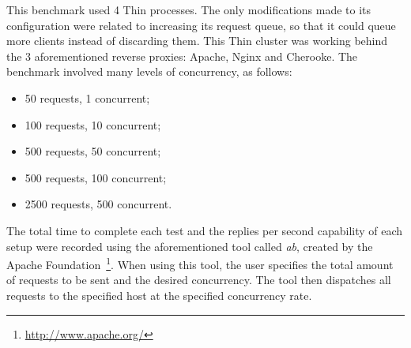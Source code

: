 This benchmark used 4 Thin processes. The only modifications made to its configuration were related to increasing its request queue, so that it could queue more clients instead of discarding them. This Thin cluster was working behind the 3 aforementioned reverse proxies: Apache, Nginx and Cherooke. The benchmark involved many levels of concurrency, as follows:
\begin{itemize}
  \item 50 requests, 1 concurrent;
  \item 100 requests, 10 concurrent;
  \item 500 requests, 50 concurrent;
  \item 500 requests, 100 concurrent;
  \item 2500 requests, 500 concurrent.
\end{itemize}
The total time to complete each test and the replies per second capability of each setup were recorded using the aforementioned tool called \textit{ab}, created by the Apache Foundation~\footnote{\url{http://www.apache.org/}}. When using this tool, the user specifies the total amount of requests to be sent and the desired concurrency. The tool then dispatches all requests to the specified host at the specified concurrency rate.


